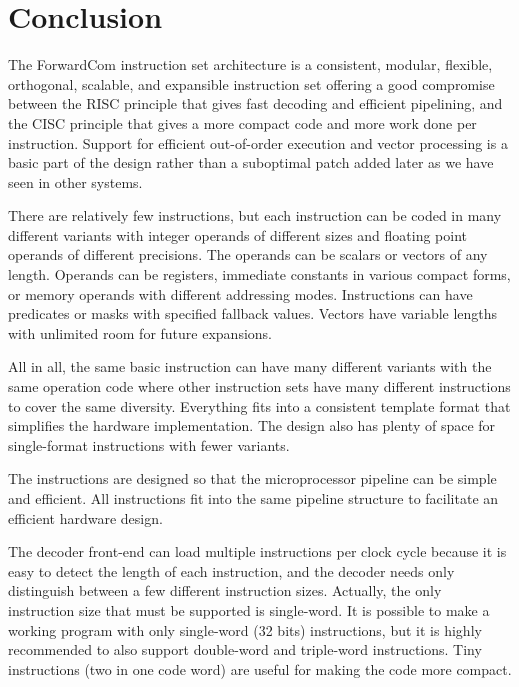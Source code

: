 \documentclass[forwardcom.tex]{subfiles}
\begin{document}
\RaggedRight

\chapter{Conclusion}
The ForwardCom instruction set architecture is a consistent, modular, 
flexible, orthogonal, scalable, and expansible instruction set offering a good compromise between the RISC principle that gives fast decoding and efficient pipelining, and the CISC principle that gives a more compact code and more work done per instruction. Support for efficient out-of-order execution and vector processing is a basic part of the design rather than a suboptimal patch added later as we have seen in other systems.
\vspace{2mm}

There are relatively few instructions, but each instruction can be coded in many different variants with integer operands of different sizes and floating point operands of different precisions. The operands can be scalars or vectors of any length. Operands can be registers, immediate constants in various compact forms, or memory operands with different addressing modes.  Instructions can have predicates or masks with specified fallback values. Vectors have variable lengths with unlimited room for future expansions.
\vspace{2mm}

All in all, the same basic instruction can have many different variants with the same operation code where other instruction sets have many different instructions to cover the same diversity. Everything fits into a consistent template format that simplifies the hardware implementation. The design also has plenty of space for single-format instructions with fewer variants. 
\vspace{2mm}

The instructions are designed so that the microprocessor pipeline can be simple and efficient. All instructions fit into the same pipeline structure to facilitate an efficient hardware design.
\vspace{2mm}

The decoder front-end can load multiple instructions per clock cycle because it is easy to detect the length of each instruction, and the decoder needs only distinguish between a few different instruction sizes. Actually, the only instruction size that must be supported is single-word. It is 
possible to make a working program with only single-word (32 bits) instructions, but it is highly recommended to also support double-word and triple-word instructions. Tiny instructions (two in one code word) are useful for making the code more compact. 
\vspace{2mm}
\end{document}
